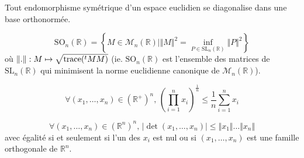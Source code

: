   \begin{application}
    Tout endomorphisme symétrique d'un espace euclidien se diagonalise dans une base orthonormée.
  \end{application}


  \begin{application}
    \[ \mathrm{SO}_n(\mathbb{R}) = \left\{ M \in \mathcal{M}_n(\mathbb{R}) \mid \Vert M \Vert^2 = \inf_{P \in \mathrm{SL}_n(\mathbb{R})} \Vert P \Vert^2 \right\} \]
    où $\Vert . \Vert : M \mapsto \sqrt{\operatorname{trace}(\mathstrut ^t MM)}$ (ie. $\mathrm{SO}_n(\mathbb{R})$ est l'ensemble des matrices de $\mathrm{SL}_n(\mathbb{R})$ qui minimisent la norme euclidienne canonique de $\mathcal{M}_n(\mathbb{R})$).
  \end{application}


  \begin{application}
    \[ \forall (x_1, \dots, x_n) \in (\mathbb{R}^+)^n, \, \left( \prod_{i=1}^{n} x_i \right)^{\frac{1}{n}} \leq \frac{1}{n} \sum_{i=1}^n x_i \]
  \end{application}


  \begin{application}
    \[ \forall (x_1, \dots, x_n) \in (\mathbb{R}^n)^n, \, \vert \det(x_1, \dots, x_n) \vert \leq \Vert x_1 \Vert \dots \Vert x_n \Vert \]
    avec égalité si et seulement si l'un des $x_i$ est nul ou si $(x_1, \dots, x_n)$ est une famille orthogonale de $\mathbb{R}^n$.
  \end{application}

  \annexessection


